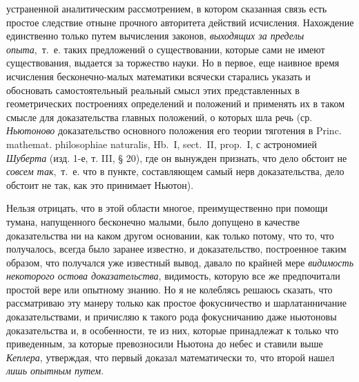 {устраненной аналитическим рассмотрением, в котором сказанная связь есть
простое следствие отныне прочного авторитета действий исчисления.
Нахождение единственно только путем вычисления законов,
{\em выходящих за пределы опыта},~т.~е. таких
предложений о существовании, которые сами не имеют существования, выдается
за торжество науки. Но в первое, еще наивное время исчисления
бесконечно-малых математики всячески старались указать и обосновать
самостоятельный реальный смысл этих представленных в геометрических
построениях определений и положений и применять их в таком смысле для
доказательства главных положений, о которых шла речь (ср.
{\em Ньютоново} доказательство основного положения его
теории тяготения в Princ. mathemat. philosophiae naturalis, Hb.~I,
sect.~II, prop.~I, с астрономией {\em Шуберта} (изд. 1-е, т. III, § 20),
где он вынужден признать, что дело обстоит не
{\em совсем так},~т.~е. что в пункте, составляющем
самый нерв доказательства, дело обстоит не так, как это принимает Ньютон).

Нельзя отрицать, что в этой области многое, преимущественно при помощи
тумана, напущенного бесконечно малыми, было допущено в качестве
доказательства ни на каком другом основании, как только потому, что то, что
получалось, всегда было заранее известно, и доказательство, построенное
таким образом, что получался уже известный вывод, давало по крайней мере
{\em видимость некоторого остова доказательства},
видимость, которую все же предпочитали простой вере или опытному знанию. Но
я не колеблясь решаюсь сказать, что рассматриваю эту манеру только как
простое фокусничество и шарлатанничание доказательствами, и причисляю к
такого рода фокусничанию даже ньютоновы доказательства и, в особенности, те
из них, которые принадлежат к только что приведенным, за которые
превозносили Ньютона до небес и ставили выше
{\em Кеплера}, утверждая, что первый доказал
математически то, что второй нашел {\em лишь опытным
путем}.

}

